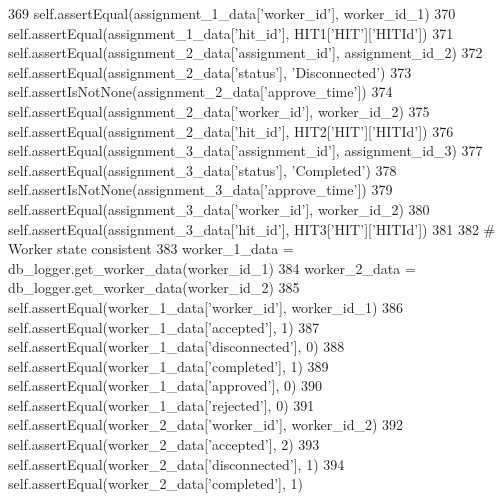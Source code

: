\begin{DoxyCode}
369         self.assertEqual(assignment\_1\_data[\textcolor{stringliteral}{'worker\_id'}], worker\_id\_1)
370         self.assertEqual(assignment\_1\_data[\textcolor{stringliteral}{'hit\_id'}], HIT1[\textcolor{stringliteral}{'HIT'}][\textcolor{stringliteral}{'HITId'}])
371         self.assertEqual(assignment\_2\_data[\textcolor{stringliteral}{'assignment\_id'}], assignment\_id\_2)
372         self.assertEqual(assignment\_2\_data[\textcolor{stringliteral}{'status'}], \textcolor{stringliteral}{'Disconnected'})
373         self.assertIsNotNone(assignment\_2\_data[\textcolor{stringliteral}{'approve\_time'}])
374         self.assertEqual(assignment\_2\_data[\textcolor{stringliteral}{'worker\_id'}], worker\_id\_2)
375         self.assertEqual(assignment\_2\_data[\textcolor{stringliteral}{'hit\_id'}], HIT2[\textcolor{stringliteral}{'HIT'}][\textcolor{stringliteral}{'HITId'}])
376         self.assertEqual(assignment\_3\_data[\textcolor{stringliteral}{'assignment\_id'}], assignment\_id\_3)
377         self.assertEqual(assignment\_3\_data[\textcolor{stringliteral}{'status'}], \textcolor{stringliteral}{'Completed'})
378         self.assertIsNotNone(assignment\_3\_data[\textcolor{stringliteral}{'approve\_time'}])
379         self.assertEqual(assignment\_3\_data[\textcolor{stringliteral}{'worker\_id'}], worker\_id\_2)
380         self.assertEqual(assignment\_3\_data[\textcolor{stringliteral}{'hit\_id'}], HIT3[\textcolor{stringliteral}{'HIT'}][\textcolor{stringliteral}{'HITId'}])
381 
382         \textcolor{comment}{# Worker state consistent}
383         worker\_1\_data = db\_logger.get\_worker\_data(worker\_id\_1)
384         worker\_2\_data = db\_logger.get\_worker\_data(worker\_id\_2)
385         self.assertEqual(worker\_1\_data[\textcolor{stringliteral}{'worker\_id'}], worker\_id\_1)
386         self.assertEqual(worker\_1\_data[\textcolor{stringliteral}{'accepted'}], 1)
387         self.assertEqual(worker\_1\_data[\textcolor{stringliteral}{'disconnected'}], 0)
388         self.assertEqual(worker\_1\_data[\textcolor{stringliteral}{'completed'}], 1)
389         self.assertEqual(worker\_1\_data[\textcolor{stringliteral}{'approved'}], 0)
390         self.assertEqual(worker\_1\_data[\textcolor{stringliteral}{'rejected'}], 0)
391         self.assertEqual(worker\_2\_data[\textcolor{stringliteral}{'worker\_id'}], worker\_id\_2)
392         self.assertEqual(worker\_2\_data[\textcolor{stringliteral}{'accepted'}], 2)
393         self.assertEqual(worker\_2\_data[\textcolor{stringliteral}{'disconnected'}], 1)
394         self.assertEqual(worker\_2\_data[\textcolor{stringliteral}{'completed'}], 1)

\end{DoxyCode}
